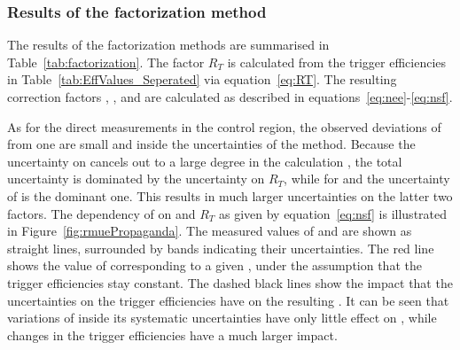 \subsubsection{Results of the factorization method}
The results of the factorization methods are summarised in Table~\ref{tab:factorization}. The factor $R_T$ is calculated from the trigger efficiencies in Table~\ref{tab:EffValues_Seperated} via equation~\ref{eq:RT}. The resulting correction factors \Rsfof, \Reeof, and \Rmmof are calculated as described in equations~\ref{eq:nee}-\ref{eq:nsf}.  

As for the direct measurements in the control region, the observed deviations of \Rsfof from one are small and inside the uncertainties of the method. Because the uncertainty on \rmue cancels out to a large degree in the calculation \Rsfof, the total uncertainty is dominated by the uncertainty on $R_T$, while for \Reeof and \Rmmof the uncertainty of \rmue is the dominant one. This results in much larger uncertainties on the latter two factors. The dependency of \Rsfof on \rmue and $R_T$ as given by equation~\ref{eq:nsf} is illustrated in Figure~\ref{fig:rmuePropaganda}. The measured values of \rmue and \Rsfof are shown as straight lines, surrounded by bands indicating their uncertainties. The red line shows the value of \Rsfof corresponding to a given \rmue, under the assumption that the trigger efficiencies stay constant. The dashed black lines show the impact that the uncertainties on the trigger efficiencies have on the resulting \Rsfof. It can be seen that variations of \rmue inside its systematic uncertainties have only little effect on \Rsfof, while changes in the trigger efficiencies have a much larger impact. 


